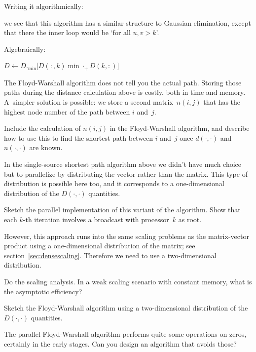 Writing it algorithmically:
\begin{displayalgorithm}
\end{displayalgorithm}
we see that this algorithm has a similar structure to Gaussian elimination, 
except that there the inner loop would be `for all $u,v>k$'.

Algebraically:
\begin{displayalgorithm}
   {
    $D\leftarrow D._{\min} \bigl[D(:,k) \mathbin{\min\cdot_+} D(k,:)  \bigr]$
  }
\end{displayalgorithm}

The Floyd-Warshall algorithm does not tell you the actual
path. Storing those paths during the distance calculation above is
costly, both in time and memory. A~simpler solution is possible: we
store a second matrix~$n(i,j)$ that has the highest node number of the
path between $i$ and~$j$.

\begin{exercise}
  Include the calculation of $n(i,j)$ in the Floyd-Warshall algorithm,
  and describe how to use this to find the shortest path between $i$
  and~$j$ once $d(\cdot,\cdot)$ and $n(\cdot,\cdot)$ are known.
\end{exercise}


In the single-source shortest path algorithm above we didn't have much
choice but to parallelize by distributing the vector rather than the
matrix.  This type of distribution is possible here too, and it
corresponds to a one-dimensional distribution of the $D(\cdot,\cdot)$
quantities.
\begin{exercise}
  Sketch the parallel implementation of this variant of the
  algorithm. Show that each $k$-th iteration involves a broadcast with
  processor~$k$ as root.
\end{exercise}
However, this approach runs into the same scaling problems as the
matrix-vector product using a one-dimensional distribution of the
matrix; see section~\ref{sec:densescaling}. Therefore we need to use a
two-dimensional distribution.
\begin{exercise}
  Do the scaling analysis. In a weak scaling scenario with constant memory, 
  what is the asymptotic efficiency?
\end{exercise}
\begin{exercise}
  Sketch the Floyd-Warshall algorithm using a two-dimensional
  distribution of the $D(\cdot,\cdot)$ quantities.
\end{exercise}
\begin{exercise}
  The parallel Floyd-Warshall algorithm performs quite some operations
  on zeros, certainly in the early stages. Can you design an algorithm
  that avoids those?
\end{exercise}

